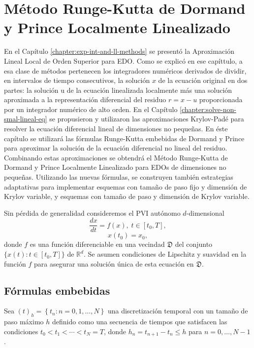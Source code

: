 \chapter{Método Runge-Kutta de Dormand y Prince Localmente Linealizado}\label{chapter:lldp}

En el Capítulo \ref{chapter:exp-int-and-ll-methods} se presentó la Aproximación Lineal Local de Orden Superior para EDO. Como se explicó en ese capíttulo, a esa clase de métodos pertenecen los integradores numéricos derivados de dividir, en intervalos de tiempo consecutivos, la solución $x$ de la ecuación original en dos partes: la solución u de la ecuación linealizada localmente más una solución aproximada a la representación diferencial del residuo $r=x-u$ proporcionada por un integrador numérico de alto orden. En el Capítulo \ref{chapter:solve-non-smal-lineal-eq} se propusieron y utilizaron las aproximaciones Krylov-Padé para resolver la ecuación diferencial lineal de dimensiones no pequeñas. En éste capítulo se utilizará las fórmulas  Runge-Kutta embebidas de Dormand y Prince para aproximar la solución de la ecuación diferencial no lineal del residuo. Combinando estas aproximaciones se obtendrá el Método Runge-Kutta de Dormand y Prince Localmente Linealizado para EDOs de dimensiones no pequeñas. Utilizando las nuevas fórmulas, se construyen también estrategias adaptativas para implementar esquemas con tamaño de paso fijo y dimensión de Krylov variable, y esquemas con tamaño de paso y dimensión de Krylov variable.

Sin pérdida de generalidad consideremos el PVI autónomo $d$-dimensional
\begin{equation}\label{syst}
\frac{dx}{dt}=f(x), \; t\in[t_0,T],\end{equation}
\begin{equation}\label{systcond}
x(t_0)=x_0,
\end{equation}donde $f$ es una función diferenciable en una vecindad
$\mathfrak{D}$ del conjunto $\{x(t):t\in [t_0,T]\}$ de $\mathbb{R}^{d}$. Se asumen condiciones de Lipschitz y suavidad en la función $f$ para asegurar una solución única de esta ecuación en $\mathfrak{D}$.

\section{Fórmulas embebidas}

Sea $\left( t\right) _{h}=\left\{ t_{n}:n=0,1,\ldots ,N\right\}$ una discretización temporal con un tamaño de paso máximo $h$ definido como una secuencia de tiempos que satisfacen las condiciones $t_{0}<t_{1}<\cdots <t_{N}=T$, donde $h_{n}=t_{n+1}-t_{n}\leq h$ para $n=0,\ldots,N-1$.

